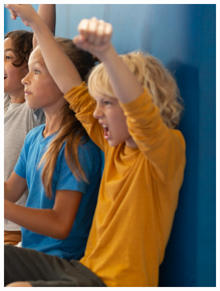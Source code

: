 \begin{figure}[htpb]
\vspace*{-2.5cm}
\hspace{-3cm}\includegraphics[height=\paperheight]{../separadores/separadorEF5B.png}
\end{figure}

\setcounter{chapter}{0}



